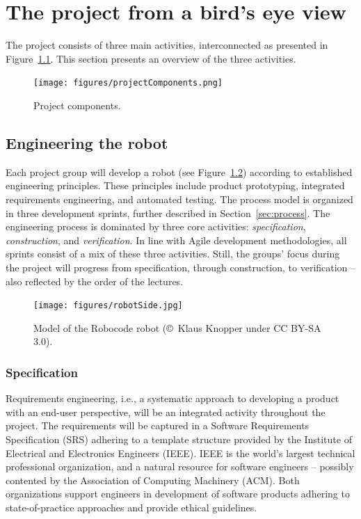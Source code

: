 \documentclass{scrreprt}
\begin{document}
\chapter{The project from a bird's eye view}
The project consists of three main activities, interconnected as presented in Figure~\ref{fig:components}. This section presents an overview of the three activities.

\begin{figure}
\centering
\texttt{[image: figures/projectComponents.png]}
\caption{Project components.}
\label{fig:components}
\end{figure}

\section{Engineering the robot}
Each project group will develop a robot (see Figure~\ref{fig:robot}) according to established engineering principles. These principles include product prototyping, integrated requirements engineering, and automated testing. The process model is organized in three development sprints, further described in Section~\ref{sec:process}. The engineering process is dominated by three core activities: \textit{specification}, \textit{construction}, and \textit{verification}. In line with Agile development methodologies, all sprints consist of a mix of these three activities. Still, the groups' focus during the project will progress from specification, through construction, to verification -- also reflected by the order of the lectures.

\begin{figure}
\centering
\texttt{[image: figures/robotSide.jpg]}
\caption{Model of the Robocode robot (\copyright~Klaus Knopper under CC BY-SA 3.0).}
\label{fig:robot}
\end{figure}

\subsection{Specification}
Requirements engineering, i.e., a systematic approach to developing a product with an end-user perspective, will be an integrated activity throughout the project. The requirements will be captured in a Software Requirements Specification (SRS) adhering to a template structure provided by the Institute of Electrical and Electronics Engineers (IEEE). IEEE is the world's largest technical professional organization, and a natural resource for software engineers -- possibly contented by the Association of Computing Machinery (ACM). Both organizations support engineers in development of software products adhering to state-of-practice approaches and provide ethical guidelines.
\end{document}
